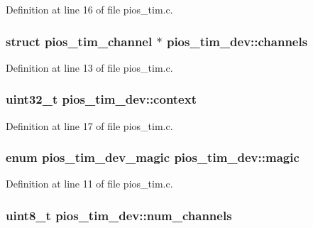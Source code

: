 \-Definition at line 16 of file pios\-\_\-tim.\-c.

\hypertarget{structpios__tim__dev_aa8efb40f5c838a19554da434d2eddf40}{
\subsubsection[{channels}]{\setlength{\rightskip}{0pt plus 5cm}struct {\bf pios\-\_\-tim\-\_\-channel} $\ast$ {\bf pios\-\_\-tim\-\_\-dev\-::channels}}}\label{structpios__tim__dev_aa8efb40f5c838a19554da434d2eddf40}


\-Definition at line 13 of file pios\-\_\-tim.\-c.

\hypertarget{structpios__tim__dev_aa2ce9a6edd8c06b75330b994f67c95b8}{
\subsubsection[{context}]{\setlength{\rightskip}{0pt plus 5cm}uint32\-\_\-t {\bf pios\-\_\-tim\-\_\-dev\-::context}}}\label{structpios__tim__dev_aa2ce9a6edd8c06b75330b994f67c95b8}


\-Definition at line 17 of file pios\-\_\-tim.\-c.

\hypertarget{structpios__tim__dev_a3656bfa8d4df8ae08ce3c330edc916f9}{
\subsubsection[{magic}]{\setlength{\rightskip}{0pt plus 5cm}enum {\bf pios\-\_\-tim\-\_\-dev\-\_\-magic} {\bf pios\-\_\-tim\-\_\-dev\-::magic}}}\label{structpios__tim__dev_a3656bfa8d4df8ae08ce3c330edc916f9}


\-Definition at line 11 of file pios\-\_\-tim.\-c.

\hypertarget{structpios__tim__dev_a2b129aa6d78b9ba69ff095d8a9c53356}{
\subsubsection[{num\-\_\-channels}]{\setlength{\rightskip}{0pt plus 5cm}uint8\-\_\-t {\bf pios\-\_\-tim\-\_\-dev\-::num\-\_\-channels}}}\label{structpios__tim__dev_a2b129aa6d78b9ba69ff095d8a9c53356}


